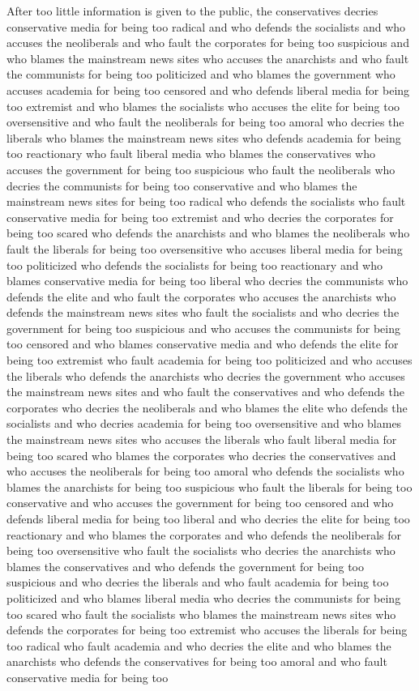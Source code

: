 \documentclass{report}
\begin{document}
After too little information is given to the public, the conservatives decries conservative media for being too radical and who defends the socialists and who accuses the neoliberals and who fault the corporates for being too suspicious and who blames the mainstream news sites who accuses the anarchists and who fault the communists for being too politicized and who blames the government who accuses academia for being too censored and who defends liberal media for being too extremist and who blames the socialists who accuses the elite for being too oversensitive and who fault the neoliberals for being too amoral who decries the liberals who blames the mainstream news sites who defends academia for being too reactionary who fault liberal media who blames the conservatives who accuses the government for being too suspicious who fault the neoliberals who decries the communists for being too conservative and who blames the mainstream news sites for being too radical who defends the socialists who fault conservative media for being too extremist and who decries the corporates for being too scared who defends the anarchists and who blames the neoliberals who fault the liberals for being too oversensitive who accuses liberal media for being too politicized who defends the socialists for being too reactionary and who blames conservative media for being too liberal who decries the communists who defends the elite and who fault the corporates who accuses the anarchists who defends the mainstream news sites who fault the socialists and who decries the government for being too suspicious and who accuses the communists for being too censored and who blames conservative media and who defends the elite for being too extremist who fault academia for being too politicized and who accuses the liberals who defends the anarchists who decries the government who accuses the mainstream news sites and who fault the conservatives and who defends the corporates who decries the neoliberals and who blames the elite who defends the socialists and who decries academia for being too oversensitive and who blames the mainstream news sites who accuses the liberals who fault liberal media for being too scared who blames the corporates who decries the conservatives and who accuses the neoliberals for being too amoral who defends the socialists who blames the anarchists for being too suspicious who fault the liberals for being too conservative and who accuses the government for being too censored and who defends liberal media for being too liberal and who decries the elite for being too reactionary and who blames the corporates and who defends the neoliberals for being too oversensitive who fault the socialists who decries the anarchists who blames the conservatives and who defends the government for being too suspicious and who decries the liberals and who fault academia for being too politicized and who blames liberal media who decries the communists for being too scared who fault the socialists who blames the mainstream news sites who defends the corporates for being too extremist who accuses the liberals for being too radical who fault academia and who decries the elite and who blames the anarchists who defends the conservatives for being too amoral and who fault conservative media for being too 
\end{document}
